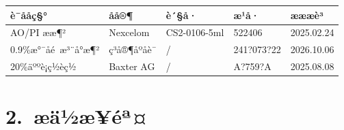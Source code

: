 \documentclass[UTF8,10pt,a4paper,fontset=fandol]{ctexart}
\newcommand{\fieldvalue}[1]{#1}
\newcommand{\handwritten}[1]{#1}
\begin{document}
\begin{center}
\begin{center}
\begin{tabularx}{\textwidth}{|l|l|l|X|X|}
\hline
è¯ååç§° & åå®¶ & è´§å· & æ¹å· & æææè³\\
\hline
AO/PI ææ¶² & Nexcelom & CS2-0106-5ml &
\fieldvalue{\handwritten{522406}} &
\fieldvalue{\handwritten{2025.02.24}}\\
\hline
0.9\%æ°¯åé æ³¨å°æ¶² & ç³å®¶åºåè¯ & / &
\fieldvalue{\handwritten{241?073?22}} &
\fieldvalue{\handwritten{2026.10.06}}\\
\hline
20\%äººè¡ç½èç½ & Baxter AG & / &
\fieldvalue{\handwritten{A?759?A}} &
\fieldvalue{\handwritten{2025.08.08}}\\
\hline
\end{tabularx}

\section*{2.\ æä½æ­¥éª¤}


\end{center}
\end{center}
\end{document}
